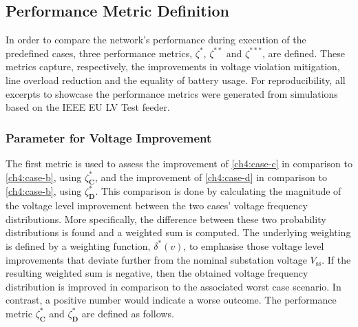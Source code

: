 \subsection{Performance Metric Definition}
\label{ch4:subsec:performance-metric-definition}

In order to compare the network's performance during execution of the predefined cases, three performance metrics, $\zeta^{*}$, $\zeta^{**}$ and $\zeta^{***}$, are defined.
These metrics capture, respectively, the improvements in voltage violation mitigation, line overload reduction and the equality of battery usage.
For reproducibility, all excerpts to showcase the performance metrics were generated from simulations based on the IEEE EU LV Test feeder.

\subsubsection{Parameter for Voltage Improvement}

The first metric is used to assess the improvement of \ref{ch4:case-c} in comparison to \ref{ch4:case-b}, using $\zeta^{*}_\textbf{C}$, and the improvement of \ref{ch4:case-d} in comparison to \ref{ch4:case-b}, using $\zeta^{*}_\textbf{D}$.
This comparison is done by calculating the magnitude of the voltage level improvement between the two cases' voltage frequency distributions.
More specifically, the difference between these two probability distributions is found and a weighted sum is computed.
The underlying weighting is defined by a weighting function, $\delta^{*}(v)$, to emphasise those voltage level improvements that deviate further from the nominal substation voltage $V_\text{ss}$.
If the resulting weighted sum is negative, then the obtained voltage frequency distribution is improved in comparison to the associated worst case scenario.
In contrast, a positive number would indicate a worse outcome.
The performance metric $\zeta^{*}_\textbf{C}$ and $\zeta^{*}_\textbf{D}$ are defined as follows.




